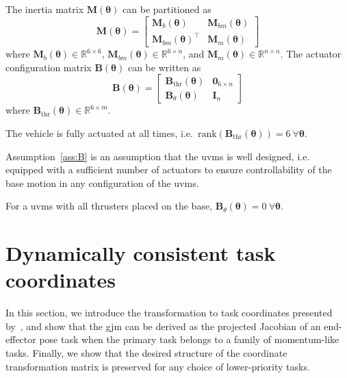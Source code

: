 \documentclass[../main.tex]{subfiles}
\begin{document}
The inertia matrix $\bm{M}(\bm{\theta})$ can be partitioned as
\begin{equation}
    \bm{M}(\bm{\theta}) = \begin{bmatrix}
        \bm{M}_b(\bm{\theta}) & \bm{M}_{bm}(\bm{\theta}) \\ \bm{M}_{bm}(\bm{\theta})^\top & \bm{M}_m(\bm{\theta})
    \end{bmatrix}
\end{equation}
where $\bm{M}_b(\bm{\theta}) \in \mathbb{R}^{6 \times 6},\, \bm{M}_{bm}(\bm{\theta}) \in \mathbb{R}^{6 \times n}$, and $\bm{M}_m(\bm{\theta}) \in \mathbb{R}^{n \times n}$. The actuator configuration matrix $\bm{B}(\bm{\theta})$ can be written as
\begin{equation}\label{eq:B}
    \bm{B}(\bm{\theta}) = \begin{bmatrix}
        \bm{B}_{\textrm{thr}}(\bm{\theta}) & \bm{0}_{6 \times n} \\ \bm{B}_{\theta}(\bm{\theta}) & \bm{I}_n
    \end{bmatrix}
\end{equation}
where $\bm{B}_{\textrm{thr}}(\bm{\theta}) \in \mathbb{R}^{6\times m}$.
\begin{assumption}\label{ass:B}
    The vehicle is fully actuated at all times, i.e.~$\textrm{rank} (\bm{B}_{\textrm{thr}}(\bm{\theta}) ) =  6 \ \forall \bm{\theta}$.
\end{assumption}
\begin{remark}
     Assumption~\ref{ass:B} is an assumption that the \gls{uvms} is well designed, i.e. equipped with a sufficient number of actuators to ensure controllability of the base motion in any configuration of the \gls{uvms}.
\end{remark}
\begin{remark}
    For a \gls{uvms} with all thrusters placed on the base, $\bm{B}_{\theta}(\bm{\theta}) = 0 \ \forall\bm{\theta}$.
\end{remark}


\section{Dynamically consistent task coordinates}\label{sec:taskcoordinates}\vspace{-8pt}
In this section, we introduce the transformation to task coordinates presented by~\cite{Dietrich2020}, and show that the \gls{gjm} can be derived as the projected Jacobian of an end-effector pose task when the primary task belongs to a family of momentum-like tasks. Finally, we show that the desired structure of the coordinate transformation matrix is preserved for any choice of lower-priority tasks.
\end{document}
